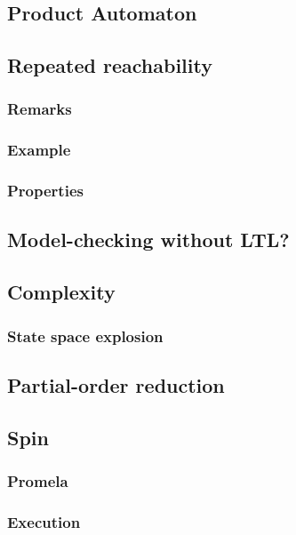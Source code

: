 \documentclass[12pt, a4paper]{book}
\begin{document}
  \subsection{Product Automaton}
  \label{sub:Product Automaton}
  \subsection{Repeated reachability}
  \label{sub:Repeated reachability}
  \subsubsection{Remarks}
  \label{subs:Remarks}
  \subsubsection{Example}
  \label{subs:Example}
  \subsubsection{Properties}
  \label{subs:Properties}
  \subsection{Model-checking without LTL?}
  \label{sub:Model-checking without LTL?}
  \subsection{Complexity}
  \label{sub:Complexity}
  \subsubsection{State space explosion}
  \label{subs:State space explosion}
  \subsection{Partial-order reduction}
  \label{sub:Partial-order reduction}
  \subsection{Spin}
  \label{sub:Spin}
  \subsubsection{Promela}
  \label{subs:Promela}
  \subsubsection{Execution}
  \label{subs:Execution}
\end{document}
